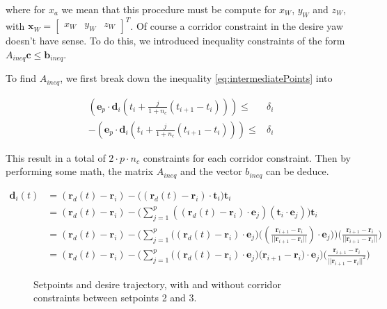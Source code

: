 \noindent where for $x_a$ we mean that this procedure must be compute for $x_W$, $y_W$ and $z_W$, with $\mathbf{x}_W=\begin{bmatrix}x_W & y_W & z_W\end{bmatrix}^T$. Of course a corridor constraint in the desire yaw doesn't have sense. To do this, we introduced inequality constraints of the form $A_{ineq}\mathbf{c}\le \mathbf{b}_{ineq}$. 

\noindent To find $A_{ineq}$, we first break down the inequality \eqref{eq:intermediatePoints} into

\begin{align}
	(\mathbf{e}_p\cdot\mathbf{d}_i(t_i+\frac{j}{1+n_c}(t_{i+1}-t_i)))\le & \delta_i \\
	-(\mathbf{e}_p\cdot\mathbf{d}_i(t_i+\frac{j}{1+n_c}(t_{i+1}-t_i)))\le & \delta_i
	\label{eq:breakConstraint}
\end{align}

\noindent This result in a total of $2\cdot p\cdot n_c$ constraints for each corridor constraint. Then by performing some math, the matrix $A_{ineq}$ and the vector $b_{ineq}$ can be deduce.

\begin{align}
	\mathbf{d}_i(t) &= (\mathbf{r}_d(t)-\mathbf{r}_i)-\big((\mathbf{r}_d(t)-\mathbf{r}_i)\cdot\mathbf{t}_i\big)\mathbf{t}_i \\
	&= (\mathbf{r}_d(t)-\mathbf{r}_i)-\Bigg(\sum_{j=1}^{p}((\mathbf{r}_d(t)-\mathbf{r}_i)\cdot\mathbf{e}_j)(\mathbf{t}_i\cdot\mathbf{e}_j)\Bigg)\mathbf{t}_i \nonumber \\
	&= (\mathbf{r}_d(t)-\mathbf{r}_i)-\Bigg(\sum_{j=1}^{p}\big((\mathbf{r}_d(t)-\mathbf{r}_i)\cdot\mathbf{e}_j\big)\big((\frac{\mathbf{r}_{i+1}-\mathbf{r}_i}{||\mathbf{r}_{i+1}-\mathbf{r}_i||})\cdot\mathbf{e}_j\big)\Bigg)\Bigg(\frac{\mathbf{r}_{i+1}-\mathbf{r}_i}{||\mathbf{r}_{i+1}-\mathbf{r}_i||}\Bigg) \nonumber \\
	&= (\mathbf{r}_d(t)-\mathbf{r}_i)-\Bigg(\sum_{j=1}^{p}\big((\mathbf{r}_d(t)-\mathbf{r}_i)\cdot\mathbf{e}_j\big)\big(\mathbf{r}_{i+1}-\mathbf{r}_i\big)\cdot\mathbf{e}_j\Bigg)\Bigg(\frac{\mathbf{r}_{i+1}-\mathbf{r}_i}{||\mathbf{r}_{i+1}-\mathbf{r}_i||^2}\Bigg) \nonumber
\end{align}

\begin{figure}[h]
	\centering
 	
 	\caption{Setpoints and desire trajectory, with and without corridor constraints between setpoints 2 and 3.}
 	\label{fig:trajectory}		
\end{figure}

